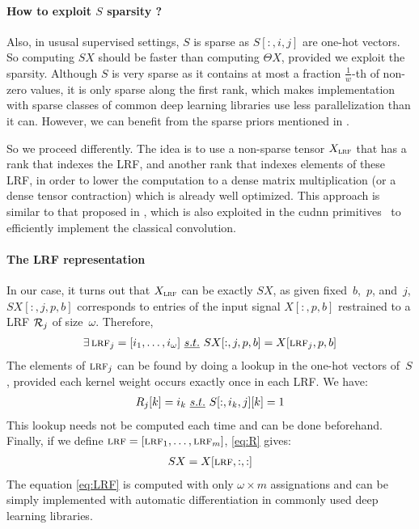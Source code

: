 \paragraph{How to exploit $S$ sparsity ?}
Also, in ususal supervised settings, $S$ is sparse as $S[:,i,j]$ are one-hot vectors. So computing $SX$ should be faster than computing $\Theta X$, provided we exploit the sparsity. Although $S$ is very sparse as it contains at most a fraction $\frac{1}{w}$-th of non-zero values, it is only sparse along the first rank, which makes implementation with sparse classes of common deep learning libraries use less parallelization than it can. However, we can benefit from the sparse priors mentioned in .%

So we proceed differently. The idea is to use a non-sparse tensor $X_{\operatorname{\textsc{lrf}}}$ that has a rank that indexes the LRF, and another rank that indexes elements of these LRF, in order to lower the computation to a dense matrix multiplication (or a dense tensor contraction) which is already well optimized. This approach is similar to that proposed in \cite{chellapilla2006high}, which is also exploited in the cudnn primitives~\citep{chetlur2014cudnn} to efficiently implement the classical convolution.

\paragraph{The LRF representation}
In our case, it turns out that $X_{\operatorname{\textsc{lrf}}}$ can be exactly $SX$, as given fixed~$b$,~$p$, and~$j$, $SX[:,j,p,b]$ corresponds to entries of the input signal $X[:,p,b]$ restrained to a LRF $\mathcal{R}_j$ of size~$\omega$. Therefore,
\begin{gather}
\exists \operatorname{\textsc{lrf}}_j = [i_1, \ldots, i_\omega]~\emph{s.t.}~ SX[:,j,p,b] = X[\operatorname{\textsc{lrf}}_j, p, b]
\label{eq:R}
\end{gather}
The elements of $\operatorname{\textsc{lrf}}_j$ can be found by doing a lookup in the one-hot vectors of~$S$, provided each kernel weight occurs exactly once in each LRF. We have:
\begin{gather}
R_j[k] = i_k~\emph{s.t.}~ S[:,i_k,j][k] = 1
\end{gather}
This lookup needs not be computed each time and can be done beforehand. Finally, if we define $\operatorname{\textsc{lrf}} = [\operatorname{\textsc{lrf}}_1, \ldots, \operatorname{\textsc{lrf}}_m]$, \eqref{eq:R} gives:
\begin{gather}
SX = X[\operatorname{\textsc{lrf}}, :, :]
\label{eq:LRF}
\end{gather}
The equation \eqref{eq:LRF} is computed with only $\omega \times m$ assignations and can be simply implemented with automatic differentiation in commonly used deep learning libraries.

